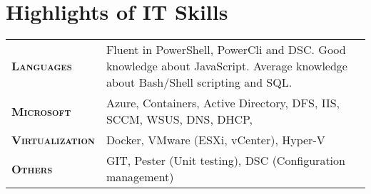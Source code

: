 \section{Highlights of IT Skills}

\begin{tabularx}{\linewidth}{>{\raggedleft\scshape}p{2.5cm}X}
\textbf{Languages} & Fluent in PowerShell, PowerCli and DSC. Good knowledge about JavaScript. Average knowledge about Bash/Shell scripting and SQL.\\
\textbf{Microsoft} & Azure, Containers, Active Directory, DFS, IIS, SCCM, WSUS, DNS, DHCP, \\
\textbf{Virtualization} & Docker, VMware (ESXi, vCenter), Hyper-V\\
\textbf{Others} & GIT, Pester (Unit testing), DSC (Configuration management)\\
\end{tabularx}
